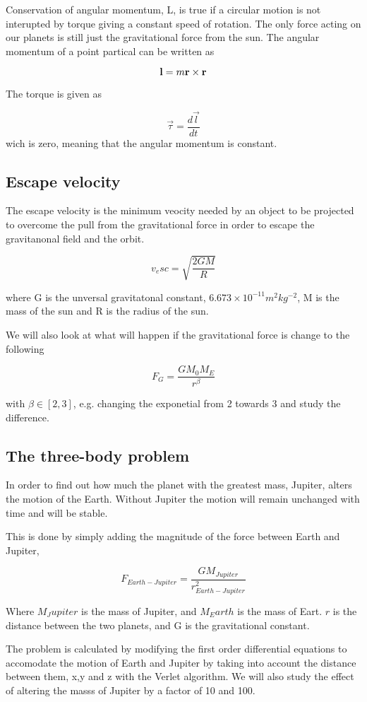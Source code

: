 \documentclass[../main.tex]{subfiles}
\begin{document}
Conservation of angular momentum, L, is true if a circular motion is not interupted by torque giving a constant speed of rotation. The only force acting on our planets is still just the gravitational force from the sun. The angular momentum of a point partical can be written as

$$\textbf l = m \textbf r \times \textbf r$$

The torque is given as

$$\vec \tau = \frac{d\vec l}{dt}$$ wich is zero, meaning that the angular momentum is constant.


\subsection{Escape velocity}
The escape velocity is the minimum veocity needed by an object to be projected to overcome the pull from the gravitational force in order to escape the gravitanonal field and the orbit.

$$v_esc = \sqrt{\frac{2GM}{R}}$$

where G is the unversal gravitatonal constant, $6.673\times 10^{-11} m^2kg^{-2}$, M is the mass of the sun and R is the radius of the sun.

We will also look at what will happen if the gravitational force is change to the following

$$F_G = \frac{GM_0M_E}{r^{\beta}}$$

with $\beta \in [2,3]$, e.g. changing the exponetial from 2 towards 3 and study the difference.

\subsection{The three-body problem}
In order to find out how much the planet with the greatest mass, Jupiter, alters the motion of the Earth. Without Jupiter the motion will remain unchanged with time and  will be stable.

This is done by simply adding the magnitude of the force between Earth and Jupiter,

\begin{equation}
  F_{Earth-Jupiter} = \frac{GM_{Jupiter}}{r^2_{Earth-Jupiter}}
\end{equation}

Where $M_Jupiter$ is the mass of Jupiter, and $M_Earth$ is the mass of Eart. $r$ is the distance between the two planets, and G is the gravitational constant.

The problem is calculated by modifying the first order differential equations to accomodate the motion of Earth and Jupiter by taking into account the distance between them, x,y and z with the Verlet algorithm. We will also study the effect of altering the masss of Jupiter by a factor of 10 and 100.
\end{document}

